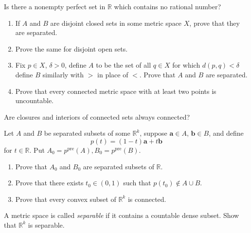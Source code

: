 \documentclass[12 pt, letterpaper]{hmcpset}
\begin{document}
\pagebreak

\begin{problem}[18.]
	Is there a nonempty perfect set in $\mathbb{R}$ which contains no rational number?
\end{problem}

\pagebreak

\begin{problem}[19.]
	\begin{enumerate}
		\item If $A$ and $B$ are disjoint closed sets in some metric space $X$, prove that they are separated.
		\item Prove the same for disjoint open sets.
		\item Fix $p \in X$, $\delta > 0$, define $A$ to be the set of all $q \in X$ for which $d(p, q) < \delta$ define $B$ similarly with $>$ in place of $<$. Prove that $A$ and $B$ are separated.
		\item Prove that every connected metric space with at least two points is uncountable.
	\end{enumerate}
\end{problem}

\pagebreak

\begin{problem}[20.]
	Are closures and interiors of connected sets always connected?
\end{problem}

\pagebreak

\begin{problem}[21.]
	Let $A$ and $B$ be separated subsets of some  $\mathbb{R}^{k}$, suppose $\mathbf{a} \in A$, $\mathbf{b} \in B$, and define
	\[
		p(t) = (1 - t)\mathbf{a} + t \mathbf{b}
	\]
	for $t \in \mathbb{R}$. Put $A_{0} = p^{\text{pre}}(A), B_{0} = p^{\text{pre}}(B)$.
	\begin{enumerate}
		\item Prove that $A_{0}$ and $B_{0}$ are separated subsets of $\mathbb{R}$.
		\item Prove that there exists $t_{0} \in (0, 1)$ such that $p(t_{0}) \notin A \cup B$.
		\item Prove that every convex subset of $\mathbb{R}^{k}$ is connected.
	\end{enumerate}
\end{problem}

\pagebreak

\begin{problem}[22.]
	A metric space is called \textit{separable} if it contains a countable dense subset. Show that $\mathbb{R}^{k}$ is separable.
\end{problem}
\end{document}
